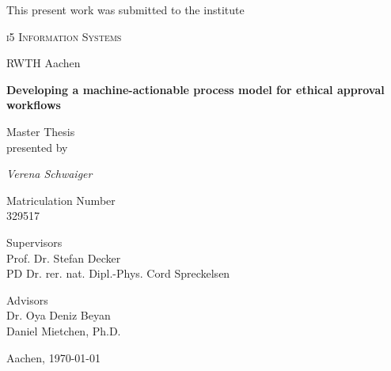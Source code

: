 \documentclass[10pt]{article}
\begin{document}
\begin{titlepage}
	\centering
	This present work was submitted to the institute\\
	{\scshape\LARGE i5 Information Systems \par
	RWTH Aachen\par}
	\vspace{1cm}

	\vspace{1.5cm}
	{\huge\bfseries Developing a machine-actionable process model for ethical approval workflows\par}
			\vspace{0.5cm}
Master Thesis\\
	\vspace{2cm}
	presented by \\
	{\Large\itshape Verena Schwaiger\par}
		\vspace{0.5cm}

	Matriculation Number\\
	329517
\begin{flushleft}


	\vfill
		\vspace{0.5cm}

	{\Large
	Supervisors}\\
					\vspace{0.25cm}
					 Prof. Dr. Stefan Decker \\
					 PD Dr. rer. nat. Dipl.-Phys. Cord Spreckelsen

	\vspace{0.5cm}

	{\Large Advisors}\\
	\vspace{0.25cm}
	Dr. Oya Deniz Beyan \\
	
Daniel Mietchen, Ph.D.
\end{flushleft}
				\vspace{0.25cm}


	
	

	\vfill

	{\large Aachen, \today\par}
\end{titlepage}

\newpage
\end{document}
